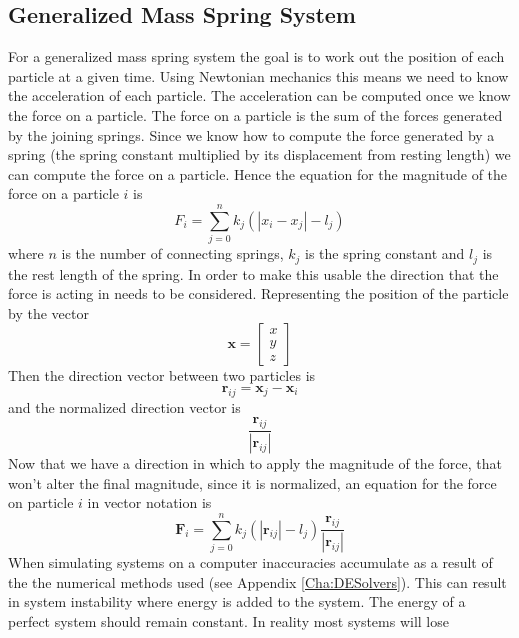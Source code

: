 \subsection{Generalized Mass Spring System}
\label{SubSec:MassSpring}
For a generalized mass spring system the goal is to work out the position of
each particle at a given time. Using Newtonian mechanics this means we need to
know the acceleration of each particle. The acceleration can be computed once we
know the force on a particle. The force on a particle is the sum of the forces
generated by the joining springs. Since we know how to compute the force
generated by a spring (the spring constant multiplied by its displacement from
resting length) we can compute the force on a particle. Hence the equation for
the magnitude of the force on a particle $i$ is
\begin{equation}
   \label{magforce}
	F_i = \sum_{j=0}^{n}k_j\left(\left|{x}_i -
      {x}_j\right|-l_j\right)        
\end{equation}
where $n$ is the number of connecting springs, $k_j$ is the spring constant and
$l_j$ is the rest length of the spring. In order to make this usable the
direction that the force is acting in needs to be considered. Representing the
position of the particle by the vector 
\[
    \mathbf{x} = \begin{bmatrix}
                    x\\
                    y\\
                    z
                 \end{bmatrix}
\] 
Then the direction vector between two particles is
\[
    \mathbf{r}_{ij} = \mathbf{x}_j - \mathbf{x}_i
\]
and the normalized direction vector is 
\[
    \frac{\mathbf{r}_{ij}}{\left|\mathbf{r}_{ij}\right|}
\]
Now that we have a direction in which to apply the magnitude of the force,
that won't alter the final magnitude, since it is normalized, an  
equation for the force on particle $i$ in vector notation is 
\begin{equation}
\label{Eqn:UndampedSpring}
    \mathbf{F}_i = \sum_{j=0}^{n}k_j\left(\left|\mathbf{r}_{ij}\right|-l_j\right)
                    \frac{\mathbf{r}_{ij}}{\left|\mathbf{r}_{ij}\right|}
\end{equation} 
When simulating systems on a computer inaccuracies accumulate as a result of the
the numerical methods used (see Appendix \ref{Cha:DESolvers}). This can
result in system instability where energy is added to the system. The energy of
a perfect system should remain constant. In reality most systems will lose
